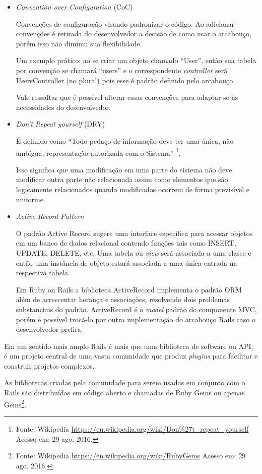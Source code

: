 \begin{itemize}
\item {\emph{Convention over Configuration} (CoC)}
    \par Convenções de configuração visando padronizar o código. Ao adicionar convenções é retirada do desenvolvedor a decisão de como usar o arcabouço, porém isso não diminui sua flexibilidade. 
    \par Um exemplo prático: ao se criar um objeto chamado ``User'', então sua tabela por convenção se chamará ``users'' e o correspondente \emph{controller} será UsersController (no plural) pois esse é padrão definido pelo arcabouço.
    \par Vale ressaltar que é possível alterar essas convenções para adaptar-se às necessidades do desenvolvedor.

\item {\emph{Don't Repeat yourself} (DRY)}
    \par É definido como ``Todo pedaço de informação deve ter uma única, não ambígua, representação autorizada com o Sistema'' \footnote{Fonte: Wikipedia \url{https://en.wikipedia.org/wiki/Don\%27t_repeat_yourself} Acesso em: 29 ago. 2016.}.
    \par Isso significa que uma modificação em uma parte do sistema não deve modificar outra parte não relacionada assim como elementos que são logicamente relacionados quando modificados ocorrem de forma previsível e uniforme.

\item { \emph{Active Record Pattern}}
    \par O padrão Active Record sugere uma interface específica para acessar objetos em um banco de dados relacional contendo funções tais como INSERT, UPDATE, DELETE, etc. Uma tabela ou \emph{view} será associada a uma classe e então uma instância de objeto estará associada a uma única entrada na respectiva tabela.
    \par Em Ruby on Rails a biblioteca ActiveRecord implementa o padrão ORM além de acrescentar herança e associações, resolvendo dois problemas substanciais do padrão. ActiveRecord é o \emph{model} padrão do componente MVC, porém é possível trocá-lo por outra implementação do arcabouço Rails caso o desenvolvedor prefira.
\end{itemize}
    \par Em um sentido mais amplo Rails é mais que uma biblioteca de software ou API, é um projeto central de uma vasta comunidade que produz \emph{plugins} para facilitar e construir projetos complexos.
	\par As bibliotecas criadas pela comunidade para serem usadas em conjunto com o Rails são distribuídas em código aberto e chamadas de Ruby Gems ou apenas Gems\footnote{Fonte: Wikipedia \url{https://en.wikipedia.org/wiki/RubyGems} Acesso em: 29 ago. 2016.}.

